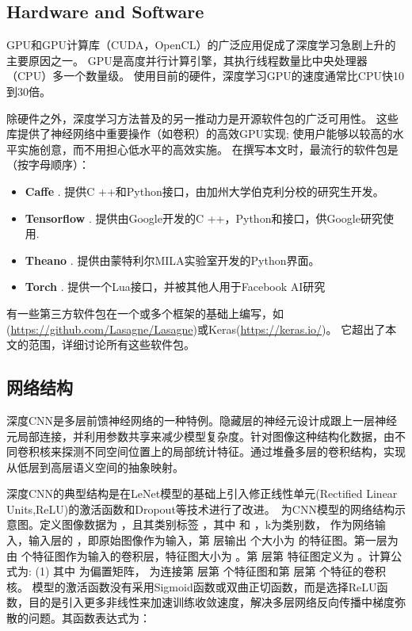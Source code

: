 \subsection{Hardware and Software}
GPU和GPU计算库（CUDA，OpenCL）的广泛应用促成了深度学习急剧上升的主要原因之一。 GPU是高度并行计算引擎，其执行线程数量比中央处理器（CPU）多一个数量级。 使用目前的硬件，深度学习GPU的速度通常比CPU快10到30倍。

除硬件之外，深度学习方法普及的另一推动力是开源软件包的广泛可用性。 这些库提供了神经网络中重要操作（如卷积）的高效GPU实现; 使用户能够以较高的水平实施创意，而不用担心低水平的高效实施。 在撰写本文时，最流行的软件包是（按字母顺序）：
\begin{itemize}
 \item {\bf Caffe} \citep{Jia14a}. 提供C ++和Python接口，由加州大学伯克利分校的研究生开发。 
 \item {\bf Tensorflow} \citep{Abad16}. 提供由Google开发的C ++，Python和接口，供Google研究使用.
 \item {\bf Theano} \citep{Bast12}. 提供由蒙特利尔MILA实验室开发的Python界面。
 \item {\bf Torch} \citep{Coll11}. 提供一个Lua接口，并被其他人用于Facebook AI研究 
\end{itemize}
有一些第三方软件包在一个或多个框架的基础上编写，如(\url{https://github.com/Lasagne/Lasagne})或Keras(\url{https://keras.io/})。 它超出了本文的范围，详细讨论所有这些软件包。

\subsection{网络结构}

深度CNN是多层前馈神经网络的一种特例。隐藏层的神经元设计成跟上一层神经元局部连接，并利用参数共享来减少模型复杂度。针对图像这种结构化数据，由不同卷积核来探测不同空间位置上的局部统计特征。通过堆叠多层的卷积结构，实现从低层到高层语义空间的抽象映射。

深度CNN的典型结构是在LeNet模型\citep{Jarrett2009}的基础上引入修正线性单元(Rectified Linear Units,ReLU)的激活函数和Dropout等技术\citep{Krizhevsky2012}进行了改进。\ 为CNN模型的网络结构示意图。定义图像数据为 ，且其类别标签 ，其中 和 ，k为类别数， 作为网络输入，输入层的 ，即原始图像作为输入，第 层输出 个大小为 的特征图。第一层为由  个特征图作为输入的卷积层，特征图大小为  。第 层第 特征图定义为  。计算公式为:
      (1)
其中 为偏置矩阵， 为连接第 层第 个特征图和第 层第 个特征的卷积核。
模型的激活函数没有采用Sigmoid函数或双曲正切函数，而是选择ReLU函数，目的是引入更多非线性来加速训练收敛速度，解决多层网络反向传播中梯度弥散的问题。其函数表达式为： 
             
